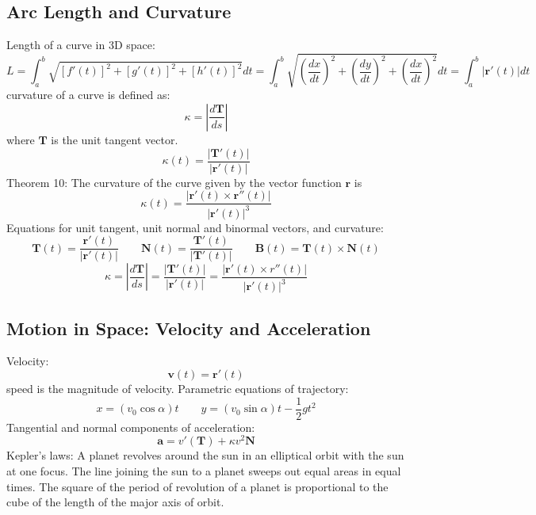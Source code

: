 \documentclass{article}
\begin{document}
    \subsection{Arc Length and Curvature}
    \begin{outline}
        \1 Length of a curve in 3D space: \[L=\int^b_a\sqrt{[f'(t)]^2+[g'(t)]^2+[h'(t)]^2}dt=\int^b_a\sqrt{\left(\dfrac{dx}{dt}\right)^2+\left(\dfrac{dy}{dt}\right)^2+\left(\dfrac{dx}{dt}\right)^2}dt=\int^b_a|\mathbf r'(t)|dt\]
        \1 curvature of a curve is defined as: \[\kappa=\left|\dfrac{d\mathbf T}{ds}\right|\] where $\mathbf T$ is the unit tangent vector. 
        \1 \[\kappa(t)=\dfrac{|\mathbf T'(t)|}{|\mathbf r'(t)|}\]
        \1 Theorem 10: The curvature of the curve given by the vector function $\mathbf r$ is \[\kappa(t)=\dfrac{|\mathbf r'(t)\times\mathbf r''(t)|}{|\mathbf r'(t)|^3}\]
        \1 Equations for unit tangent, unit normal and binormal vectors, and curvature: \[\mathbf T(t)=\dfrac{\mathbf r'(t)}{|\mathbf r'(t)|}\qquad \mathbf N(t)=\dfrac{\mathbf T'(t)}{|\mathbf T'(t)|}\qquad \mathbf B(t)=\mathbf T(t)\times\mathbf N(t)\]\[\kappa=\left|\dfrac{d\mathbf T}{ds}\right|=\dfrac{|\mathbf T'(t)|}{|\mathbf r'(t)|}=\dfrac{|\mathbf r'(t)\times r''(t)|}{|\mathbf r'(t)|^3}\]

    \end{outline}
    \subsection{Motion in Space: Velocity and Acceleration}
    \begin{outline}
        \1 Velocity: \[\mathbf v(t)=\mathbf r'(t)\]
        \1 speed is the magnitude of velocity. 
        \1 Parametric equations of trajectory: \[x=(v_0\cos\alpha)t\qquad y=(v_0\sin\alpha)t-\frac{1}{2}gt^2\]
        \1 Tangential and normal components of acceleration: \[\mathbf a=v'(\mathbf T)+\kappa v^2\mathbf N\]
        \1 Kepler's laws: 
            \2 A planet revolves around the sun in an elliptical orbit with the sun at one focus. 
            \2 The line joining the sun to a planet sweeps out equal areas in equal times. 
            \2 The square of the period of revolution of a planet is proportional to the cube of the length of the major axis of orbit. 
    \end{outline}
\end{document}
